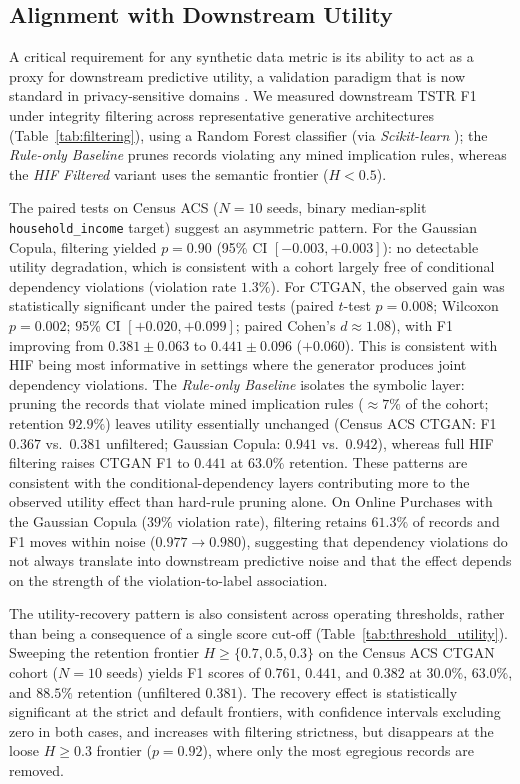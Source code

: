 \documentclass[pdflatex,sn-mathphys-num]{sn-jnl}
\theoremstyle{thmstyleone}%
\theoremstyle{thmstyletwo}%
\theoremstyle{thmstylethree}%
\begin{document}
\subsection{Alignment with Downstream Utility}\label{sec:utility}

A critical requirement for any synthetic data metric is its ability to act as a proxy for downstream predictive utility, a validation paradigm that is now standard in privacy-sensitive domains \cite{jordon2019pateggan}. We measured downstream TSTR F1 under integrity filtering across representative generative architectures (Table~\ref{tab:filtering}), using a Random Forest classifier \cite{breiman2001random} (via \textit{Scikit-learn} \cite{pedregosa2011scikit}); the \textit{Rule-only Baseline} prunes records violating any mined implication rules, whereas the \textit{HIF Filtered} variant uses the semantic frontier ($H < 0.5$).

The paired tests on Census ACS ($N=10$ seeds, binary median-split \texttt{household\_income} target) suggest an asymmetric pattern. For the Gaussian Copula, filtering yielded $p = 0.90$ (95\% CI $[-0.003, +0.003]$): no detectable utility degradation, which is consistent with a cohort largely free of conditional dependency violations (violation rate $1.3\%$). For CTGAN, the observed gain was statistically significant under the paired tests (paired $t$-test $p = 0.008$; Wilcoxon $p = 0.002$; 95\% CI $[+0.020, +0.099]$; paired Cohen's $d \approx 1.08$), with F1 improving from $0.381 \pm 0.063$ to $0.441 \pm 0.096$ ($+0.060$). This is consistent with HIF being most informative in settings where the generator produces joint dependency violations. The \textit{Rule-only Baseline} isolates the symbolic layer: pruning the records that violate mined implication rules ($\approx 7\%$ of the cohort; retention $92.9\%$) leaves utility essentially unchanged (Census ACS CTGAN: F1 $0.367$ vs.\ $0.381$ unfiltered; Gaussian Copula: $0.941$ vs.\ $0.942$), whereas full HIF filtering raises CTGAN F1 to $0.441$ at $63.0\%$ retention. These patterns are consistent with the conditional-dependency layers contributing more to the observed utility effect than hard-rule pruning alone. On Online Purchases with the Gaussian Copula ($39\%$ violation rate), filtering retains $61.3\%$ of records and F1 moves within noise ($0.977 \to 0.980$), suggesting that dependency violations do not always translate into downstream predictive noise and that the effect depends on the strength of the violation-to-label association.

The utility-recovery pattern is also consistent across operating thresholds, rather than being a consequence of a single score cut-off (Table~\ref{tab:threshold_utility}). Sweeping the retention frontier $H \geq \{0.7, 0.5, 0.3\}$ on the Census ACS CTGAN cohort ($N=10$ seeds) yields F1 scores of $0.761$, $0.441$, and $0.382$ at $30.0\%$, $63.0\%$, and $88.5\%$ retention (unfiltered $0.381$). The recovery effect is statistically significant at the strict and default frontiers, with confidence intervals excluding zero in both cases, and increases with filtering strictness, but disappears at the loose $H \geq 0.3$ frontier ($p = 0.92$), where only the most egregious records are removed.
\end{document}
